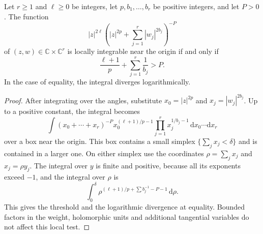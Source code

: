 \begin{lemma}\label{lem:anisotropic-fiber-integrability}
Let $r\geq1$ and $\ell\geq0$ be integers, let $p,b_1,\ldots,b_r$ be positive integers, and let $P>0$. The function
\[
 |z|^{2\ell}\left(|z|^{2p}+\sum_{j=1}^r|w_j|^{2b_j}\right)^{-P}
\]
of $(z,w)\in\mathbb C\times\mathbb C^r$ is locally integrable near the origin if and only if
\[
 \frac{\ell+1}{p}+\sum_{j=1}^r\frac1{b_j}>P.
\]
In the case of equality, the integral diverges logarithmically.
\end{lemma}
\begin{proof}
After integrating over the angles, substitute $x_0=|z|^{2p}$ and $x_j=|w_j|^{2b_j}$. Up to a positive constant, the integral becomes
\[
 \int (x_0+\cdots+x_r)^{-P}x_0^{(\ell+1)/p-1}
                  \prod_{j=1}^r x_j^{1/b_j-1}\,\mathrm dx_0\cdots\mathrm dx_r
\]
over a box near the origin. This box contains a small simplex $\{\sum_jx_j<\delta\}$ and is contained in a larger one. On either simplex use the coordinates $\rho=\sum_jx_j$ and $x_j=\rho y_j$. The integral over $y$ is finite and positive, because all its exponents exceed $-1$, and the integral over $\rho$ is
\[
 \int_0^\delta\rho^{(\ell+1)/p+\sum b_j^{-1}-P-1}\,\mathrm d\rho.
\]
This gives the threshold and the logarithmic divergence at equality. Bounded factors in the weight, holomorphic units and additional tangential variables do not affect this local test.
\end{proof}

